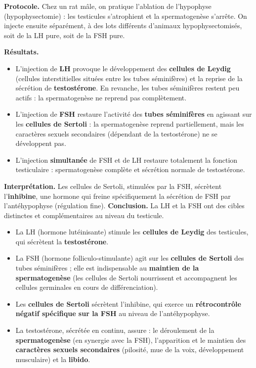 \documentclass[11pt]{article}
\newcommand{\cle}[1]{{\popxbold\color{popdark}#1}}
\begin{document}
\begin{experience}
\textbf{Protocole.} Chez un rat mâle, on pratique l'ablation de l'hypophyse (hypophysectomie) : les testicules s'atrophient et la spermatogenèse s'arrête. On injecte ensuite séparément, à des lots différents d'animaux hypophysectomisés, soit de la LH pure, soit de la FSH pure.

\textbf{Résultats.}
\begin{itemize}
\item L'injection de \textbf{LH} provoque le développement des \textbf{cellules de Leydig} (cellules interstitielles situées entre les tubes séminifères) et la reprise de la sécrétion de \textbf{testostérone}. En revanche, les tubes séminifères restent peu actifs : la spermatogenèse ne reprend pas complètement.
\item L'injection de \textbf{FSH} restaure l'activité des \textbf{tubes séminifères} en agissant sur les \textbf{cellules de Sertoli} : la spermatogenèse reprend partiellement, mais les caractères sexuels secondaires (dépendant de la testostérone) ne se développent pas.
\item L'injection \textbf{simultanée} de FSH et de LH restaure totalement la fonction testiculaire : spermatogenèse complète et sécrétion normale de testostérone.
\end{itemize}

\textbf{Interprétation.} Les cellules de Sertoli, stimulées par la FSH, sécrètent l'\textbf{inhibine}, une hormone qui freine spécifiquement la sécrétion de FSH par l'antéhypophyse (régulation fine).
\textbf{Conclusion.} La LH et la FSH ont des cibles distinctes et complémentaires au niveau du testicule.
\end{experience}

\begin{aretenir}
\begin{itemize}
\item La \cle{LH} (hormone lutéinisante) stimule les \textbf{cellules de Leydig} des testicules, qui sécrètent la \textbf{testostérone}.
\item La \cle{FSH} (hormone folliculo-stimulante) agit sur les \textbf{cellules de Sertoli} des tubes séminifères ; elle est indispensable au \textbf{maintien de la spermatogenèse} (les cellules de Sertoli nourrissent et accompagnent les cellules germinales en cours de différenciation).
\item Les \textbf{cellules de Sertoli} sécrètent l'\cle{inhibine}, qui exerce un \textbf{rétrocontrôle négatif spécifique sur la FSH} au niveau de l'antéhypophyse.
\item La \cle{testostérone}, sécrétée en continu, assure : le déroulement de la \textbf{spermatogenèse} (en synergie avec la FSH), l'apparition et le maintien des \textbf{caractères sexuels secondaires} (pilosité, mue de la voix, développement musculaire) et la \textbf{libido}.
\end{itemize}
\end{aretenir}
\end{document}
